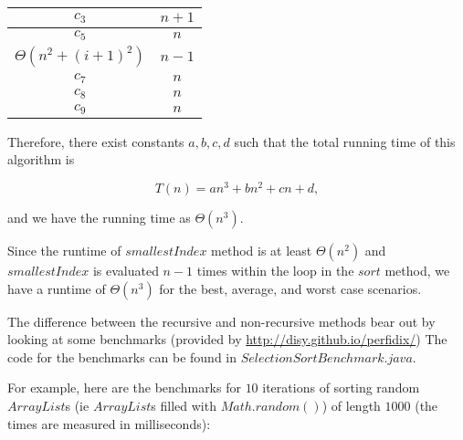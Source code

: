 \documentclass{article}
\begin{document}
\bigskip

\begin{tabular}{|c|c|}
\hline 
$c_3$ & $n+1$ \\ 
\hline 
$c_5$ & $n$ \\ 
\hline 
$\Theta\left(n^2 + (i+1)^2\right)$ & $n-1$ \\ 
\hline 
$c_7$ & $n$ \\ 
\hline 
$c_8$ & $n$ \\ 
\hline 
$c_9$ & $n$ \\ 
\hline  
\end{tabular} 

\bigskip
\bigskip

Therefore, there exist constants $a,b,c,d$ such that the total running time of this algorithm is

\[
	T(n) = a n^3 + b n^2 + c n + d,
\]

\noindent and we have the running time as $\Theta(n^3)$.

Since the runtime of $smallestIndex$ method is at least $\Theta(n^2)$ and $smallestIndex$ is evaluated $n-1$ times within the loop in the $sort$ method, we have a runtime of $\Theta(n^3)$ for the best, average, and worst case scenarios.

The difference between the recursive and non-recursive methods bear out by looking at some benchmarks (provided by \href{Perfidix}{http://disy.github.io/perfidix/}) The code for the benchmarks can be found in $SelectionSortBenchmark.java$.

For example, here are the benchmarks for $10$ iterations of sorting random $ArrayList$s (ie $ArrayList$s filled with $Math.random()$) of length $1000$ (the times are measured in milliseconds):
\end{document}
